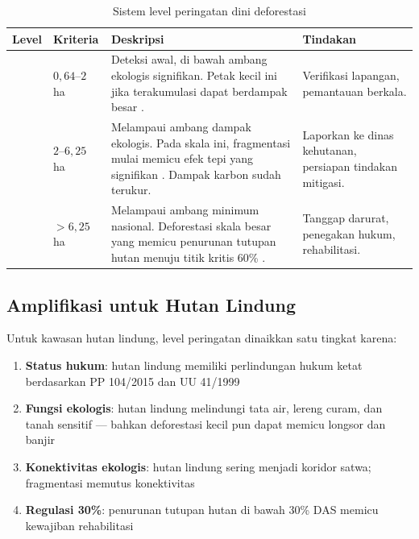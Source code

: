 \documentclass[12pt,a4paper]{article}
\begin{document}
\begin{table}[H]
\centering
\caption{Sistem level peringatan dini deforestasi}
\label{tab:alert_levels}
\small
\begin{tabular}{clp{6cm}p{4cm}}
\toprule
\textbf{Level} & \textbf{Kriteria} & \textbf{Deskripsi} & \textbf{Tindakan} \\
\midrule
\color{greenalert}{$\bigtriangleup$}
& $0,64$--$2$ ha &
Deteksi awal, di bawah ambang ekologis signifikan.
Petak kecil ini jika terakumulasi dapat berdampak besar
\cite{xu2026nature}. &
Verifikasi lapangan, pemantauan berkala. \\
\midrule
\color{yellowalert}{$\blacktriangle$}
& $2$--$6,25$ ha &
Melampaui ambang dampak ekologis. Pada skala ini,
fragmentasi mulai memicu efek tepi yang signifikan
\cite{taubert2018fragmentation}. Dampak karbon sudah
terukur. &
Laporkan ke dinas kehutanan,
persiapan tindakan mitigasi. \\
\midrule
\color{redalert}{$\blacktriangle$}
& $>6,25$ ha &
Melampaui ambang minimum nasional. Deforestasi skala
besar yang memicu penurunan tutupan hutan menuju titik
kritis 60\% \cite{gupta2025fragmentation}. &
Tanggap darurat, penegakan
hukum, rehabilitasi. \\
\bottomrule
\end{tabular}
\end{table}

\subsection{Amplifikasi untuk Hutan Lindung}

Untuk kawasan hutan lindung, level peringatan dinaikkan satu tingkat karena:

\begin{enumerate}[nosep]
    \item \textbf{Status hukum}: hutan lindung memiliki perlindungan hukum
          ketat berdasarkan PP 104/2015 dan UU 41/1999
    \item \textbf{Fungsi ekologis}: hutan lindung melindungi tata air, lereng
          curam, dan tanah sensitif — bahkan deforestasi kecil pun dapat
          memicu longsor dan banjir
    \item \textbf{Konektivitas ekologis}: hutan lindung sering menjadi koridor
          satwa; fragmentasi memutus konektivitas
    \item \textbf{Regulasi 30\%}: penurunan tutupan hutan di bawah 30\% DAS
          memicu kewajiban rehabilitasi
\end{enumerate}
\end{document}
